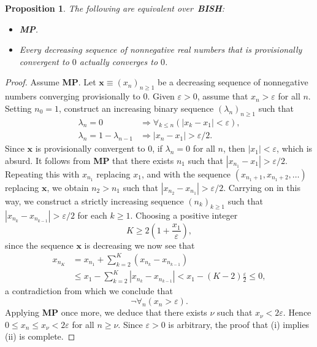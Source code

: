 \documentclass[10pt,a4paper]{amsart}
\newtheorem{proposition}{Proposition}
\begin{document}
\begin{proposition}
\label{2}The following are equivalent over\emph{\ \textbf{BISH}}:

\begin{itemize}
\item[\emph{(i)}] \emph{\textbf{MP}}.

\item[\emph{(ii)}] Every decreasing sequence of nonnegative real numbers that
is provisionally convergent to $0$ actually converges to $0$.
\end{itemize}
\end{proposition}

\begin{proof}
Assume \textbf{MP}. Let $\mathbf{x\equiv}\left(  x_{n}\right)  _{n\geqslant1}
$ be a decreasing sequence of nonnegative numbers converging provisionally to
$0$. Given $\varepsilon>0$, assume that $x_{n}>\varepsilon$ for all $n$.
Setting $n_{0}=1$, construct an increasing binary sequence $\left(
\lambda_{n}\right)  _{n\geqslant1}$ such that%
\begin{align*}
\lambda_{n}=0  & \Rightarrow\forall_{k\leqslant n}\left(  \left\vert
x_{k}-x_{1}\right\vert <\varepsilon\right)  ,\\
\lambda_{n}=1-\lambda_{n-1}  & \Rightarrow\left\vert x_{n}-x_{1}\right\vert
>\varepsilon/2.
\end{align*}
Since $\mathbf{x}$ is provisionally convergent to $0$, if $\lambda_{n}=0$ for
all $n$, then $\left\vert x_{1}\right\vert <\varepsilon$, which is absurd. It
follows from \textbf{MP} that there exists $n_{1}$ such that $\left\vert
x_{n_{1}}-x_{1}\right\vert >\varepsilon/2$. Repeating this with $x_{n_{1}}$
replacing $x_{1}$, and with the sequence $\left(  x_{n_{1}+1},x_{n_{1}%
+2},\ldots\right)  $ replacing $\mathbf{x}$, we obtain $n_{2}>n_{1}$ such that
$\left\vert x_{n_{2}}-x_{n_{1}}\right\vert >\varepsilon/2$. Carrying on in
this way, we construct a strictly increasing sequence $\left(  n_{k}\right)
_{k\geqslant1}$ such that $\left\vert x_{n_{k}}-x_{n_{k-1}}\right\vert
>\varepsilon/2$ for each $k\geqslant1$. Choosing a positive integer%
\[
K\geqslant2\left(  1+\frac{x_{1}}{\varepsilon}\right)  ,
\]
since the sequence $\mathbf{x}$ is decreasing we now see that%
\begin{align*}
x_{n_{K}}  & =x_{n_{1}}+\sum_{k=2}^{K}\left(  x_{n_{k}}-x_{n_{k-1}}\right) \\
& \leqslant x_{1}-\sum_{k=2}^{K}\left\vert x_{n_{k}}-x_{n_{k-1}}\right\vert
<x_{1}-\left(  K-2\right)  \frac{\varepsilon}{2}\leqslant0,
\end{align*}
a contradiction from which we conclude that%
\[
\lnot\forall_{n}\left(  x_{n}>\varepsilon\right)  .
\]
Applying \textbf{MP} once more, we deduce that there exists $\nu$ such that
$x_{\nu}<2\varepsilon$. Hence $0\leqslant x_{n}\leqslant x_{\nu}<2\varepsilon$
for all $n\geqslant\nu$. Since $\varepsilon>0$ is arbitrary, the proof that
(i) implies (ii) is complete.


\end{proof}
\end{document}
